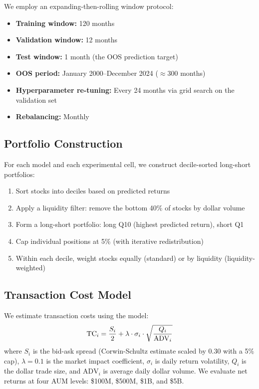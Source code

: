 \documentclass[a4paper,12pt,final]{article}
\begin{document}
We employ an expanding-then-rolling window protocol:
\begin{itemize}
\item \textbf{Training window:} 120 months
\item \textbf{Validation window:} 12 months
\item \textbf{Test window:} 1 month (the OOS prediction target)
\item \textbf{OOS period:} January 2000--December 2024 ($\approx$300 months)
\item \textbf{Hyperparameter re-tuning:} Every 24 months via grid search on the validation set
\item \textbf{Rebalancing:} Monthly
\end{itemize}

\subsection{Portfolio Construction}
\label{subsec:portfolio_construction}

For each model and each experimental cell, we construct decile-sorted long-short portfolios:
\begin{enumerate}
\item Sort stocks into deciles based on predicted returns
\item Apply a liquidity filter: remove the bottom 40\% of stocks by dollar volume
\item Form a long-short portfolio: long Q10 (highest predicted return), short Q1
\item Cap individual positions at 5\% (with iterative redistribution)
\item Within each decile, weight stocks equally (standard) or by liquidity (liquidity-weighted)
\end{enumerate}

\subsection{Transaction Cost Model}
\label{subsec:tc_model}

We estimate transaction costs using the \citet{frazzini2018trading} model:
\begin{equation}
\mathrm{TC}_i = \frac{S_i}{2} + \lambda \cdot \sigma_i \cdot \sqrt{\frac{Q_i}{\text{ADV}_i}}
\label{eq:tc_model}
\end{equation}
where $S_i$ is the bid-ask spread (Corwin-Schultz estimate scaled by 0.30 with a 5\% cap), $\lambda = 0.1$ is the market impact coefficient, $\sigma_i$ is daily return volatility, $Q_i$ is the dollar trade size, and $\text{ADV}_i$ is average daily dollar volume. We evaluate net returns at four AUM levels: \$100M, \$500M, \$1B, and \$5B.
\end{document}
